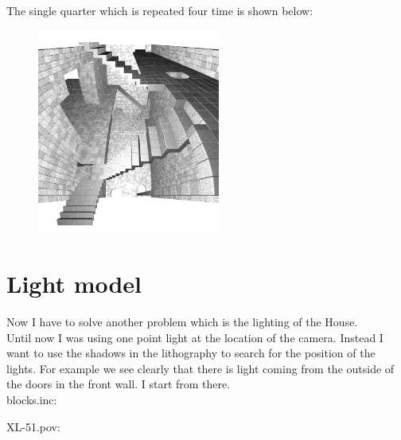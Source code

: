 \documentclass[12pt, a4paper]{article}
\begin{document}
The single quarter which is repeated four time is shown below:\\

\begin{center}
\begin{figure}[H]
\centering
\includegraphics[width=6cm]{./quarter.png}\\
\end{figure}
\end{center}

\section{Light model}

Now I have to solve another problem which is the lighting of the House.\\

Until now I was using one point light at the location of the camera. Instead I want to use the shadows in the lithography to search for the position of the lights. For example we see clearly that there is light coming from the outside of the doors in the front wall. I start from there.\\

blocks.inc:\\
\begin{scriptsize}
\begin{ttfamily}

\end{ttfamily}
\end{scriptsize}

XL-51.pov:\\
\begin{scriptsize}
\begin{ttfamily}

\end{ttfamily}
\end{scriptsize}
\end{document}
